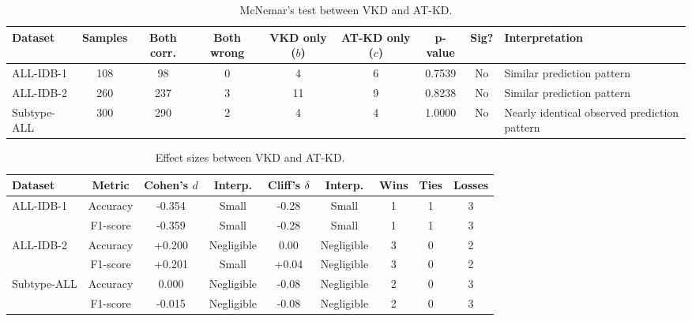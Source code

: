 \documentclass[preprint,review,12pt]{elsarticle}
\begin{document}
\begin{table}[tbp]
\centering
\caption{McNemar's test between VKD and AT-KD.}
\label{tab:mcnemar}
\footnotesize
\renewcommand{\arraystretch}{1.2}
\setlength{\tabcolsep}{3pt}
\begin{tabular}{l c c c c c c c L{0.16\textwidth}}
\toprule
\textbf{Dataset} & \textbf{Samples} & \textbf{Both corr.} & \textbf{Both wrong} & \textbf{VKD only ($b$)} & \textbf{AT-KD only ($c$)} & \textbf{p-value} & \textbf{Sig?} & \textbf{Interpretation} \\
\midrule
ALL-IDB-1 & 108 & 98 & 0 & 4 & 6 & 0.7539 & No & Similar prediction pattern \\
ALL-IDB-2 & 260 & 237 & 3 & 11 & 9 & 0.8238 & No & Similar prediction pattern \\
Subtype-ALL & 300 & 290 & 2 & 4 & 4 & 1.0000 & No & Nearly identical observed prediction pattern \\
\bottomrule
\end{tabular}
\end{table}
\begin{table}[tbp]
\centering
\caption{Effect sizes between VKD and AT-KD.}
\label{tab:effect}
\footnotesize
\renewcommand{\arraystretch}{1.2}
\setlength{\tabcolsep}{3pt}
\begin{tabular}{l c c c c c c c c}
\toprule
\textbf{Dataset} & \textbf{Metric} & \textbf{Cohen's $d$} & \textbf{Interp.} & \textbf{Cliff's $\delta$} & \textbf{Interp.} & \textbf{Wins} & \textbf{Ties} & \textbf{Losses} \\
\midrule
ALL-IDB-1 & Accuracy & -0.354 & Small & -0.28 & Small & 1 & 1 & 3 \\
 & F1-score & -0.359 & Small & -0.28 & Small & 1 & 1 & 3 \\
ALL-IDB-2 & Accuracy & +0.200 & Negligible & 0.00 & Negligible & 3 & 0 & 2 \\
 & F1-score & +0.201 & Small & +0.04 & Negligible & 3 & 0 & 2 \\
Subtype-ALL & Accuracy & 0.000 & Negligible & -0.08 & Negligible & 2 & 0 & 3 \\
 & F1-score & -0.015 & Negligible & -0.08 & Negligible & 2 & 0 & 3 \\
\bottomrule
\end{tabular}
\end{table}
\end{document}
